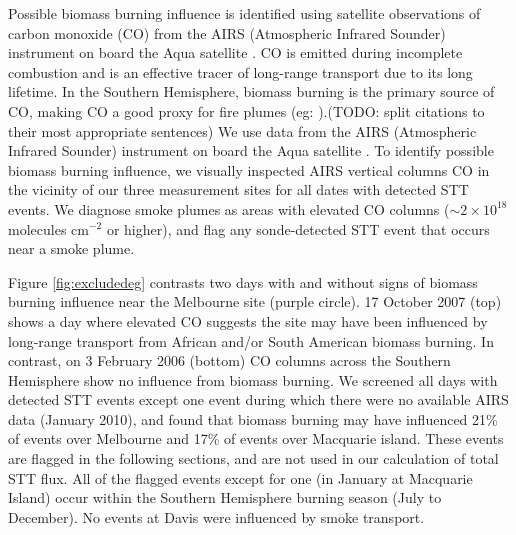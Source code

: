 \documentclass{article}
\begin{document}
    Possible biomass burning influence is identified using satellite observations of carbon monoxide (CO) from the AIRS (Atmospheric Infrared Sounder) instrument on board the Aqua satellite \citep{AIRS3STD}.
    CO is emitted during incomplete combustion and is an effective tracer of long-range transport due to its long lifetime.
    In the Southern Hemisphere, biomass burning is the primary source of CO, making CO a good proxy for fire plumes (eg: \citet{Edwards2003,Sinha2004,Edwards2006,Mari2008}).(TODO: split citations to their most appropriate sentences)
    We use data from the AIRS (Atmospheric Infrared Sounder) instrument on board the Aqua satellite \citep{AIRS3STD}.
    To identify possible biomass burning influence, we visually inspected AIRS vertical columns CO in the vicinity of our three measurement sites for all dates with detected STT events.
    We diagnose smoke plumes as areas with elevated CO columns ($\sim 2 \times 10^{18}$ molecules cm$^{-2}$ or higher), and flag any sonde-detected STT event that occurs near a smoke plume.

    Figure \ref{fig:excludedeg} contrasts two days with and without signs of biomass burning influence near the Melbourne site (purple circle).
    17 October 2007 (top) shows a day where elevated CO suggests the site may have been influenced by long-range transport from African and/or South American biomass burning.
    In contrast, on 3 February 2006 (bottom) CO columns across the Southern Hemisphere show no influence from biomass burning.
    We screened all days with detected STT events except one event during which there were no available AIRS data (January 2010), and found that biomass burning may have influenced 21\% of events over Melbourne and 17\% of events over Macquarie island.
    These events are flagged in the following sections, and are not used in our calculation of total STT flux.
    All of the flagged events except for one (in January at Macquarie Island) occur within the Southern Hemisphere burning season (July to December).%
    No events at Davis were influenced by smoke transport.
    
\end{document}
